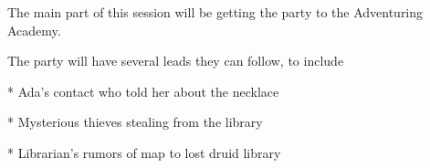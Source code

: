 The main part of this session will be getting the party to the Adventuring Academy.

The party will have several leads they can follow, to include

* Ada's contact who told her about the necklace

* Mysterious thieves stealing from the library

* Librarian's rumors of map to lost druid library
